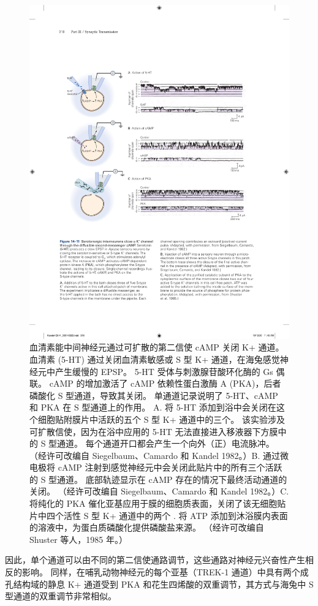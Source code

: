 \begin{figure}[htbp]
	\centering
	\includegraphics[width=0.85\linewidth]{chap14/fig_14_11}
	\caption{血清素能中间神经元通过可扩散的第二信使 cAMP 关闭 K+ 通道。 血清素 (5-HT) 通过关闭血清素敏感或 S 型 K+ 通道，在海兔感觉神经元中产生缓慢的 EPSP。 5-HT 受体与刺激腺苷酸环化酶的 Gs 偶联。 cAMP 的增加激活了 cAMP 依赖性蛋白激酶 A (PKA)，后者磷酸化 S 型通道，导致其关闭。 单通道记录说明了 5-HT、cAMP 和 PKA 在 S 型通道上的作用。 A. 将 5-HT 添加到浴中会关闭在这个细胞贴附膜片中活跃的五个 S 型 K+ 通道中的三个。 该实验涉及可扩散信使，因为在浴中应用的 5-HT 无法直接进入移液器下方膜中的 S 型通道。 每个通道开口都会产生一个向外（正）电流脉冲。 （经许可改编自 Siegelbaum、Camardo 和 Kandel 1982。）B. 通过微电极将 cAMP 注射到感觉神经元中会关闭此贴片中的所有三个活跃的 S 型通道。 底部轨迹显示在 cAMP 存在的情况下最终活动通道的关闭。 （经许可改编自 Siegelbaum、Camardo 和 Kandel 1982。）C. 将纯化的 PKA 催化亚基应用于膜的细胞质表面，关闭了该无细胞贴片中四个活性 S 型 K+ 通道中的两个 . 将 ATP 添加到沐浴膜内表面的溶液中，为蛋白质磷酸化提供磷酸盐来源。 （经许可改编自 Shuster 等人，1985 年。）}
	\label{fig:14_11}
\end{figure}


因此，单个通道可以由不同的第二信使通路调节，这些通路对神经元兴奋性产生相反的影响。
同样，在哺乳动物神经元的每个亚基（TREK-1 通道）中具有两个成孔结构域的静息 K+ 通道受到 PKA 和花生四烯酸的双重调节，其方式与海兔中 S 型通道的双重调节非常相似。



